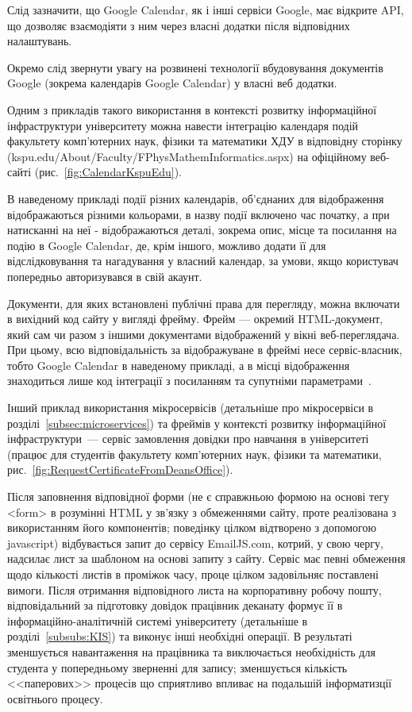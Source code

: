 Слід зазначити, що Google Calendar, як і інші сервіси Google, має відкрите API, що дозволяє взаємодіяти з ним через власні додатки після відповідних налаштувань.

Окремо слід звернути увагу на розвинені технології вбудовування документів Google (зокрема календарів Google Calendar) у власні веб додатки. 

Одним з прикладів такого використання в контексті розвитку інформаційної інфраструктури університету можна навести інтеграцію календаря подій факультету комп'ютерних наук, фізики та математики ХДУ в відповідну сторінку (kspu.edu/About/Faculty/FPhysMathemInformatics.aspx) на офіційному веб-сайті (рис.~\ref{fig:CalendarKspuEdu}).


В наведеному прикладі події різних календарів, об'єднаних для відображення відображаються різними кольорами, в назву події включено час початку, а при натисканні на неї - відображаються деталі, зокрема опис, місце та посилання на подію в Google Calendar, де, крім іншого, можливо додати її для відслідковування та нагадування у власний календар, за умови, якщо користувач попередньо авторизувався в свій акаунт.

Документи, для яких встановлені публічні права для перегляду, можна включати в вихідний код сайту у вигляді фрейму. Фрейм — окремий HTML-документ, який сам чи разом з іншими документами відображений у вікні веб-переглядача. При цьому, всю відповідальність за відображуване в фреймі несе сервіс-власник, тобто Google Calendar в наведеному прикладі, а в місці відображення знаходиться лише код інтеграції з посиланням та супутніми параметрами~\cite{ліщина2014проблеми}.

Інший приклад використання мікросервісів (детальніше про мікросервіси в розділі~\ref{subsec:microservices}) та фреймів у контексті розвитку інформаційної інфраструктури~--- сервіс замовлення довідки про навчання в університеті (працює для студентів факультету комп'ютерних наук, фізики та математики, рис.~\ref{fig:RequestCertificateFromDeansOffice}).


Після заповнення відповідної форми (не є справжньою формою на основі тегу <form> в розумінні HTML у зв'язку з обмеженнями сайту, проте реалізована з використанням його компонентів; поведінку цілком відтворено з допомогою javascript) відбувається запит до сервісу EmailJS.com, котрий, у свою чергу, надсилає лист за шаблоном на основі запиту з сайту. Сервіс має певні обмеження щодо кількості листів в проміжок часу, проце цілком задовільняє поставлені вимоги. Після отримання відповідного листа на корпоративну робочу пошту, відповідальний за підготовку довідок працівник деканату формує її в інформаційно-аналітичній системі університету  (детальніше в розділі~\ref{subsubs:KIS}) та виконує інші необхідні операції. В результаті зменшується навантаження на працівника та виключається необхідність  для студента у попередньому зверненні для запису; зменшується кількість <<паперових>> процесів що сприятливо впливає на подальшій інформатизції освітнього процесу.

